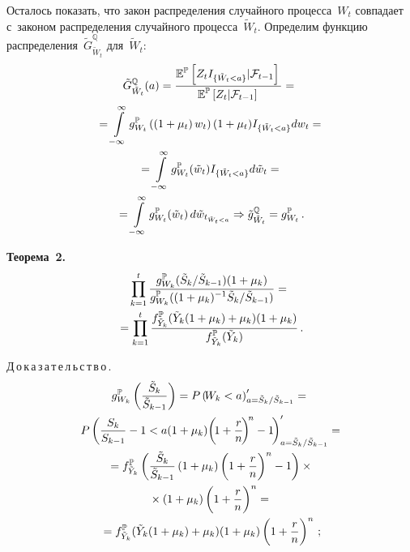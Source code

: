 \begin{multicols}{2}
  Осталось показать, что закон распределения случайного процесса~$W_t$ 
совпадает с~законом распределения случайного процесса~$\tilde{W}_t$. 
Определим функцию 
распределения~${\tilde{G}}_{\tilde{W}_t}^{\mathbb{Q}}$ для~$\tilde{W}_t$:
  \begin{multline*}
  \tilde{G}_{\tilde{W}_t}^{\mathbb{Q}}(a)=\displaystyle\frac{\displaystyle \mathbb{E}^{\mathbb{P}}\left[ Z_t 
I_{\{\tilde{W}_t<a\}}\vert \mathcal{F}_{t-1}\right]\mathstrut}{\displaystyle \mathbb{E}^{\mathbb{P}}\left[ Z_t\vert\mathcal{F}_{t-1}\right]\mathstrut}= {}\\
{}=
\int\limits^\infty_{-\infty} g^{\mathbb{P}}_{W_t}\left(\left( 1+\mu_t\right) 
w_t\right)(1+\mu_t)I_{\{\tilde{W}_t<a\}}dw_t ={}\\
  {}=\int\limits^\infty_{-\infty} 
g^{\mathbb{P}}_{W_t}(\tilde{w}_t)I_{\{\tilde{W}_t<a\}}d\tilde{w}_t={}\\
  {}= \int\limits_{-\infty}^\infty g_{W_t}^{\mathbb{P}} (\tilde{w}_t)\, 
d\tilde{w}_{t_{\tilde{W}_t<a}}\Rightarrow 
\tilde{g}_{\tilde{W}_t}^{\mathbb{Q}}=g^{\mathbb{P}}_{W_t}\,.
  \end{multline*}
  
  
  \smallskip
  
  \noindent
\textbf{Теорема~2.}
\begin{multline*}
\prod\limits^t_{k=1}\displaystyle\frac{\displaystyle g^{\mathbb{P}}_{W_k} (\tilde{S}_k/\tilde{S}_{k-
1})(1+\mu_k)\mathstrut}{\displaystyle  g^{\mathbb{P}}_{W_k} ((1+\mu_k)^{-1} \tilde{S}_k/\tilde{S}_{k-
1})\mathstrut}={}\\
{}= \prod\limits^t_{k=1}
\displaystyle\frac{\displaystyle f^{\mathbb{P}}_{\tilde{Y}_k} (\tilde{Y}_k(1+\mu_k)+\mu_k)(1+\mu_k)\mathstrut}{\displaystyle f^{\mathbb{P}}_{\tilde{Y}_k} (\tilde{Y}_k)\mathstrut}\,.
\end{multline*}

\noindent
Д\,о\,к\,а\,з\,а\,т\,е\,л\,ь\,с\,т\,в\,о\,.
\begin{multline*}
g^{\mathbb{P}}_{W_k}\left( \displaystyle\frac{\displaystyle \tilde{S}_k\mathstrut}{\displaystyle \tilde{S}_{k-1}\mathstrut}\right)=
P\left(\!W_k<a\right)^\prime_{a=\tilde{S}_k/\tilde{S}_{k-1}}={}\\
P\left( \displaystyle\frac{\displaystyle S_k\mathstrut}{\displaystyle S_{k-1}\mathstrut}-1<a(1+\mu_k)\!\left(\!1+\displaystyle\frac{\displaystyle r\mathstrut}{\displaystyle n\mathstrut}\!\right)^{\!n}-
1\!\right)^\prime_{a=\tilde{S}_k/\tilde{S}_{k-1}}=\\
{}= f^{\mathbb{P}}_{\tilde{Y}_k} \left(\displaystyle\frac{\displaystyle \tilde{S}_k\mathstrut}{\displaystyle \tilde{S}_{k-1}\mathstrut} 
\left(1+\mu_k\right) \left(1+\displaystyle\frac{\displaystyle r\mathstrut}{\displaystyle n\mathstrut}\right)^n-1\right) \times{}\\
{}\times(1+\mu_k) 
\left(1+\displaystyle\frac{\displaystyle r\mathstrut}{\displaystyle n\mathstrut}\right)^n={}\\
{}=f^{\mathbb{P}}_{\tilde{Y}_k} 
(\tilde{Y}_k(1+\mu_k)+\mu_k)(1+\mu_k)\left(1+\displaystyle\frac{\displaystyle r\mathstrut}{\displaystyle n\mathstrut}\right)^n\,;
\end{multline*}


\end{multicols}
